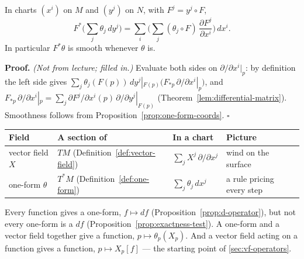 \documentclass[11pt]{report}
\makeatletter
\newcounter{thmcounter}[section]
\renewenvironment{proof}[1][Proof]{\noindent\textbf{#1.} }{\hfill$\square$\par\vspace{5pt}}
\newcommand{\thmlabel}[1]{\edef\@currentlabel{\arabic{section}.\arabic{thmcounter}}\label{#1}}
\makeatother
\begin{document}
\begin{propbox}\thmlabel{prop:pullback-coords}
In charts $(x^i)$ on $M$ and $(y^j)$ on $N$, with $F^j = y^j \circ F$,
\[
F^*\Big(\sum_j \theta_j\, dy^j\Big) = \sum_i \Big( \sum_j (\theta_j \circ F)\, \frac{\partial F^j}{\partial x^i} \Big)\, dx^i .
\]
In particular $F^*\theta$ is smooth whenever $\theta$ is.
\end{propbox}

\begin{proof}
\textit{(Not from lecture; filled in.)} Evaluate both sides on $\partial/\partial x^i|_p$: by definition the left side gives $\sum_j \theta_j(F(p))\, dy^j|_{F(p)}\big(F_{*p}\, \partial/\partial x^i|_p\big)$, and $F_{*p}\, \partial/\partial x^i|_p = \sum_j \partial F^j/\partial x^i(p)\, \partial/\partial y^j|_{F(p)}$ (Theorem~\ref{lem:differential-matrix}). Smoothness follows from Proposition~\ref{prop:one-form-coords}.
\end{proof}

\begin{rembox}\label{rem:fields-side-by-side}
\begin{center}
\renewcommand{\arraystretch}{1.3}
\begin{tabular}{p{} p{} p{} p{}}
\hline
Field & A section of & In a chart & Picture \\
\hline
vector field $X$ & $TM$ (Definition~\ref{def:vector-field}) & $\sum_j X^j\, \partial/\partial x^j$ & wind on the surface \\
one-form $\theta$ & $T^*M$ (Definition~\ref{def:one-form}) & $\sum_j \theta_j\, dx^j$ & a rule pricing every step \\
\hline
\end{tabular}
\end{center}
Every function gives a one-form, $f \mapsto df$ (Proposition~\ref{prop:d-operator}), but not every one-form is a $df$ (Proposition~\ref{prop:exactness-test}). A one-form and a vector field together give a function, $p \mapsto \theta_p(X_p)$. And a vector field acting on a function gives a function, $p \mapsto X_p[f]$ --- the starting point of \ref{sec:vf-operators}.
\end{rembox}

\end{document}
